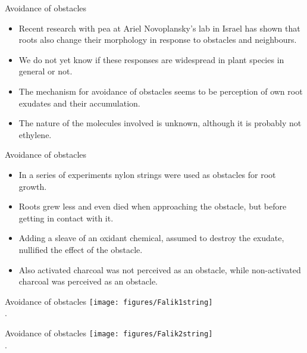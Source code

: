 \documentclass[10pt]{beamer}
\begin{document}
\begin{frame}{Avoidance of obstacles}
    \begin{itemize}
        \item Recent research with pea at Ariel Novoplansky's lab in Israel has shown that roots also change their morphology in response to obstacles and neighbours.
        \item We do not yet know if these responses are widespread in plant species in general or not.
        \item The mechanism for avoidance of obstacles seems to be perception of own root exudates and their accumulation.
        \item The nature of the molecules involved is unknown, although it is probably not ethylene.
    \end{itemize}
\end{frame}

\begin{frame}{Avoidance of obstacles}
    \begin{itemize}
        \item In a series of experiments nylon strings were used as obstacles for root growth.
        \item Roots grew less and even died when approaching the obstacle, but before getting in contact with it.
        \item Adding a sleave of an oxidant chemical, assumed to destroy the exudate, nullified the effect of the obstacle.
        \item Also activated charcoal was not perceived as an obstacle, while non-activated charcoal was perceived as an obstacle.
    \end{itemize}
\end{frame}

\begin{frame}{Avoidance of obstacles}
    \centering
    \texttt{[image: figures/Falik1string]}\\
    {\small \autocite[from][]{Falik2005}.}
\end{frame}

\begin{frame}{Avoidance of obstacles}
    \centering
    \texttt{[image: figures/Falik2string]}\\
    {\small \autocite[from][]{Falik2005}.}
\end{frame}

\end{document}
